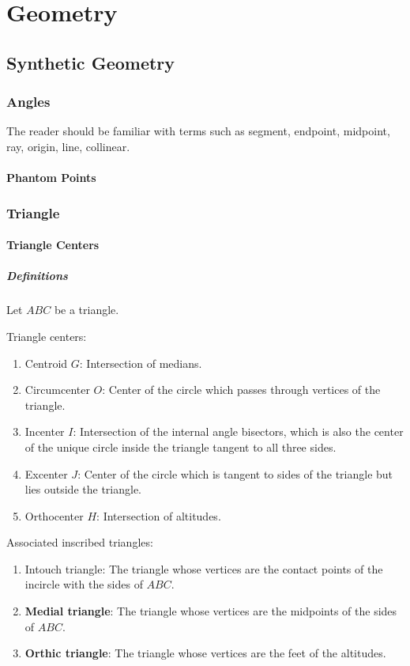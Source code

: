 \part{Geometry}
\chapter{Synthetic Geometry}
\section{Angles}
The reader should be familiar with terms such as segment, endpoint, midpoint, ray, origin, line, collinear.
\subsection{Phantom Points}

\section{Triangle}
\subsection{Triangle Centers}
\subsubsection{Definitions}
Let $ABC$ be a triangle. 

Triangle centers:
\begin{enumerate}
    \item Centroid $G$: Intersection of medians.
    \item Circumcenter $O$: Center of the circle which passes through vertices of the triangle.
    \item Incenter $I$: Intersection of the internal angle bisectors, which is also the center of the unique circle inside the triangle tangent to all three sides.
    \item Excenter $J$: Center of the circle which is tangent to sides of the triangle but lies outside the triangle.
    \item Orthocenter $H$: Intersection of altitudes.
\end{enumerate}

Associated inscribed triangles:
\begin{enumerate}
    \item Intouch triangle: The triangle whose vertices are the contact points of the incircle with the sides of $ABC$.
    \item \textbf{Medial triangle}: The triangle whose vertices are the midpoints of the sides of $ABC$.
    \item \textbf{Orthic triangle}: The triangle whose vertices are the feet of the altitudes.
\end{enumerate}

